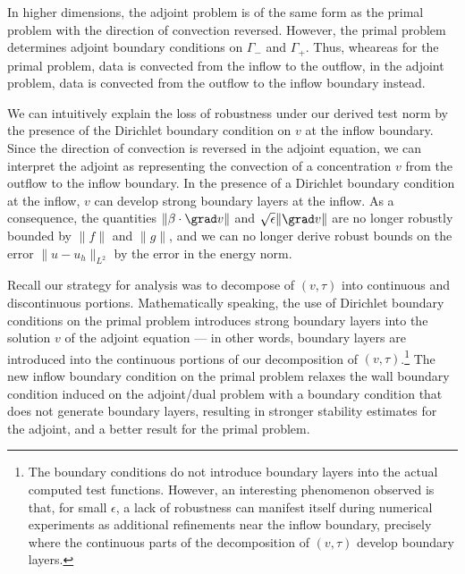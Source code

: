 In higher dimensions, the adjoint problem is of the same form as the primal problem with the direction of convection reversed. However, the primal problem determines adjoint boundary conditions on $\Gamma_-$ and $\Gamma_+$. Thus, wheareas for the primal problem, data is convected from the inflow to the outflow, in the adjoint problem, data is convected from the outflow to the inflow boundary instead. 

We can intuitively explain the loss of robustness under our derived test norm by the presence of the Dirichlet boundary condition on $v$ at the inflow boundary. Since the direction of convection is reversed in the adjoint equation, we can interpret the adjoint as representing the convection of a concentration $v$ from the outflow to the inflow boundary. In the presence of a Dirichlet boundary condition at the inflow, $v$ can develop strong boundary layers at the inflow. As a consequence, the quantities $\|\beta\cdot \grad v\|$ and $\sqrt{\epsilon}\|\grad v\|$ are no longer robustly bounded by $\|f\|$ and $\|g\|$, and we can no longer derive robust bounds on the error $\|u-u_h\|_{L^2}$ by the error in the energy norm.

Recall our strategy for analysis was to decompose of $(v,\tau)$ into continuous and discontinuous portions. Mathematically speaking, the use of Dirichlet boundary conditions on the primal problem introduces strong boundary layers into the solution $v$ of the adjoint equation --- in other words, boundary layers are introduced into the continuous portions of our decomposition of $(v,\tau)$.\footnote{The boundary conditions do not introduce boundary layers into the actual computed test functions. However, an interesting phenomenon observed is that, for small $\epsilon$, a lack of robustness can manifest itself during numerical experiments as additional refinements near the inflow boundary, precisely where the continuous parts of the decomposition of $(v,\tau)$ develop boundary layers.} The new inflow boundary condition on the primal problem relaxes the wall boundary condition induced on the adjoint/dual problem with a boundary condition that does not generate boundary layers, resulting in stronger stability estimates for the adjoint, and a better result for the primal problem. 


